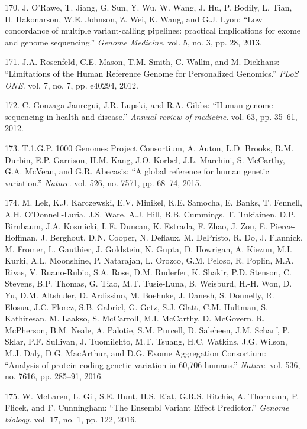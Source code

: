 \documentclass[12pt,a4paper,twoside]{ugathesis}
\theoremstyle{definition}
\theoremstyle{definition}
\theoremstyle{definition}
\theoremstyle{remark}
\begin{document}
\hypertarget{ref-ORawe2013}{}
170. J. O'Rawe, T. Jiang, G. Sun, Y. Wu, W. Wang, J. Hu, P. Bodily, L.
Tian, H. Hakonarson, W.E. Johnson, Z. Wei, K. Wang, and G.J. Lyon: ``Low
concordance of multiple variant-calling pipelines: practical
implications for exome and genome sequencing.'' \emph{Genome Medicine}.
vol. 5, no. 3, pp. 28, 2013.

\hypertarget{ref-Rosenfeld2012}{}
171. J.A. Rosenfeld, C.E. Mason, T.M. Smith, C. Wallin, and M. Diekhans:
``Limitations of the Human Reference Genome for Personalized Genomics.''
\emph{PLoS ONE}. vol. 7, no. 7, pp. e40294, 2012.

\hypertarget{ref-Gonzaga-Jauregui2012}{}
172. C. Gonzaga-Jauregui, J.R. Lupski, and R.A. Gibbs: ``Human genome
sequencing in health and disease.'' \emph{Annual review of medicine}.
vol. 63, pp. 35--61, 2012.

\hypertarget{ref-1000GenomesProjectConsortium2015}{}
173. T.1.G.P. 1000 Genomes Project Consortium, A. Auton, L.D. Brooks,
R.M. Durbin, E.P. Garrison, H.M. Kang, J.O. Korbel, J.L. Marchini, S.
McCarthy, G.A. McVean, and G.R. Abecasis: ``A global reference for human
genetic variation.'' \emph{Nature}. vol. 526, no. 7571, pp. 68--74,
2015.

\hypertarget{ref-Lek2016}{}
174. M. Lek, K.J. Karczewski, E.V. Minikel, K.E. Samocha, E. Banks, T.
Fennell, A.H. O'Donnell-Luria, J.S. Ware, A.J. Hill, B.B. Cummings, T.
Tukiainen, D.P. Birnbaum, J.A. Kosmicki, L.E. Duncan, K. Estrada, F.
Zhao, J. Zou, E. Pierce-Hoffman, J. Berghout, D.N. Cooper, N. Deflaux,
M. DePristo, R. Do, J. Flannick, M. Fromer, L. Gauthier, J. Goldstein,
N. Gupta, D. Howrigan, A. Kiezun, M.I. Kurki, A.L. Moonshine, P.
Natarajan, L. Orozco, G.M. Peloso, R. Poplin, M.A. Rivas, V.
Ruano-Rubio, S.A. Rose, D.M. Ruderfer, K. Shakir, P.D. Stenson, C.
Stevens, B.P. Thomas, G. Tiao, M.T. Tusie-Luna, B. Weisburd, H.-H. Won,
D. Yu, D.M. Altshuler, D. Ardissino, M. Boehnke, J. Danesh, S. Donnelly,
R. Elosua, J.C. Florez, S.B. Gabriel, G. Getz, S.J. Glatt, C.M. Hultman,
S. Kathiresan, M. Laakso, S. McCarroll, M.I. McCarthy, D. McGovern, R.
McPherson, B.M. Neale, A. Palotie, S.M. Purcell, D. Saleheen, J.M.
Scharf, P. Sklar, P.F. Sullivan, J. Tuomilehto, M.T. Tsuang, H.C.
Watkins, J.G. Wilson, M.J. Daly, D.G. MacArthur, and D.G. Exome
Aggregation Consortium: ``Analysis of protein-coding genetic variation
in 60,706 humans.'' \emph{Nature}. vol. 536, no. 7616, pp. 285--91,
2016.

\hypertarget{ref-McLaren2016}{}
175. W. McLaren, L. Gil, S.E. Hunt, H.S. Riat, G.R.S. Ritchie, A.
Thormann, P. Flicek, and F. Cunningham: ``The Ensembl Variant Effect
Predictor.'' \emph{Genome biology}. vol. 17, no. 1, pp. 122, 2016.
\end{document}
